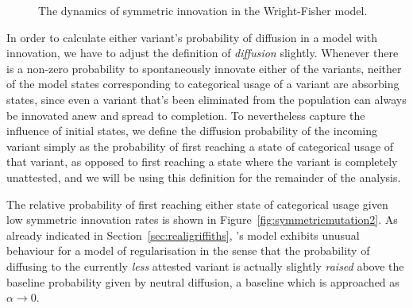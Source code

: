 \begin{knitrout}
\color{fgcolor}\begin{figure}[htbp]

{\centering {}

}

\caption[The dynamics of symmetric innovation in the Wright-Fisher model]{The dynamics of symmetric innovation in the Wright-Fisher model.}\label{fig:symmetricmutation}
\end{figure}


\end{knitrout}

In order to calculate either variant's probability of diffusion in a model with innovation, we have to adjust the definition of \emph{diffusion} slightly. Whenever there is a non-zero probability to spontaneously innovate either of the variants, neither of the model states corresponding to categorical usage of a variant are absorbing states, since even a variant that's been eliminated from the population can always be innovated anew and spread to completion. To nevertheless capture the influence of initial states, we define the diffusion probability of the incoming variant simply as the probability of first reaching a state of categorical usage of that variant, as opposed to first reaching a state where the variant is completely unattested, and we will be using this definition for the remainder of the analysis.

The relative probability of first reaching either state of categorical usage given low symmetric innovation rates is shown in Figure~\ref{fig:symmetricmutation2}. As already indicated in Section~\ref{sec:realigriffiths}, \citeauthor{Reali2009}'s model exhibits unusual behaviour for a model of regularisation in the sense that the probability of diffusing to the currently \emph{less} attested variant is actually slightly \emph{raised} above the baseline probability given by neutral diffusion, a baseline which is approached as~$\alpha\rightarrow0$.

